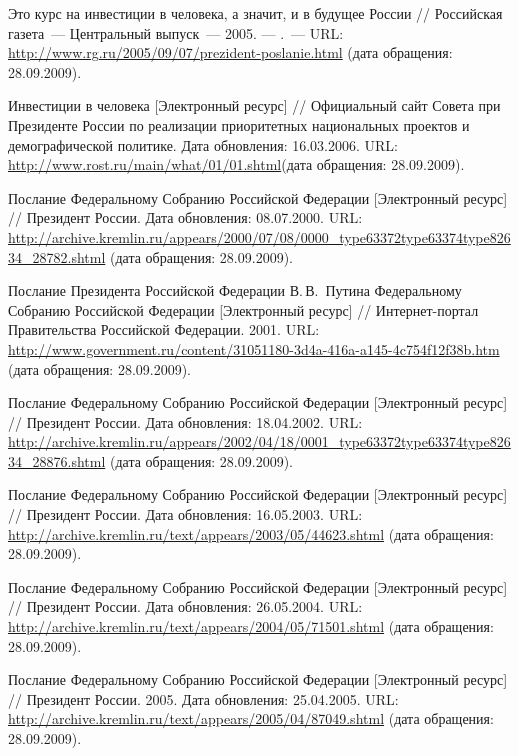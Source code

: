 \begin{thebibliography}{99}
 Это курс на инвестиции в человека, а значит, и в
  будущее России // Российская газета~--- Центральный выпуск~---
  2005. — .~--- URL:
  \url{http://www.rg.ru/2005/09/07/prezident-poslanie.html} (дата
  обращения: 28.09.2009).

 Инвестиции в человека [Электронный ресурс] //
  Официальный сайт Совета при Президенте России по реализации
  приоритетных национальных проектов и демографической политике. Дата
  обновления: 16.03.2006. URL:
  \url{http://www.rost.ru/main/what/01/01.shtml}(дата обращения:
  28.09.2009).

 Послание Федеральному Собранию Российской
  Федерации [Электронный ресурс] // Президент России. Дата обновления:
  08.07.2000.  URL:
  \url{http://archive.kremlin.ru/appears/2000/07/08/0000_type63372type63374type82634_28782.shtml}
  (дата обращения: 28.09.2009).

Послание Президента Российской Федерации
  В.\,В.~Путина Федеральному Собранию Российской Федерации
  [Электронный ресурс] // Интернет-портал Правительства Российской
  Федерации. 2001.  URL:
  \url{http://www.government.ru/content/31051180-3d4a-416a-a145-4c754f12f38b.htm}
  (дата обращения: 28.09.2009).

 Послание Федеральному Собранию Российской
  Федерации [Электронный ресурс] // Президент России. Дата обновления:
  18.04.2002. URL:
  \url{http://archive.kremlin.ru/appears/2002/04/18/0001_type63372type63374type82634_28876.shtml}
  (дата обращения: 28.09.2009).

 Послание Федеральному Собранию Российской
  Федерации [Электронный ресурс] // Президент России. Дата обновления:
  16.05.2003. URL:
  \url{http://archive.kremlin.ru/text/appears/2003/05/44623.shtml}
  (дата обращения: 28.09.2009).

 Послание Федеральному Собранию Российской
  Федерации [Электронный ресурс] // Президент России. Дата обновления:
  26.05.2004. URL:
  \url{http://archive.kremlin.ru/text/appears/2004/05/71501.shtml}
  (дата обращения: 28.09.2009).

 Послание Федеральному Собранию Российской
  Федерации [Электронный ресурс] // Президент России. 2005. Дата
  обновления: 25.04.2005. URL:
  \url{http://archive.kremlin.ru/text/appears/2005/04/87049.shtml}
  (дата обращения: 28.09.2009).


\end{thebibliography}
